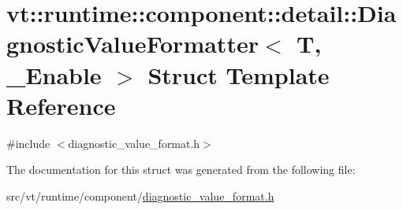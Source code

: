 \hypertarget{structvt_1_1runtime_1_1component_1_1detail_1_1_diagnostic_value_formatter}{}\section{vt\+:\+:runtime\+:\+:component\+:\+:detail\+:\+:Diagnostic\+Value\+Formatter$<$ T, \+\_\+\+Enable $>$ Struct Template Reference}
\label{structvt_1_1runtime_1_1component_1_1detail_1_1_diagnostic_value_formatter}


{\ttfamily \#include $<$diagnostic\+\_\+value\+\_\+format.\+h$>$}



The documentation for this struct was generated from the following file\+:\begin{DoxyCompactItemize}
\item 
src/vt/runtime/component/\hyperlink{diagnostic__value__format_8h}{diagnostic\+\_\+value\+\_\+format.\+h}\end{DoxyCompactItemize}
